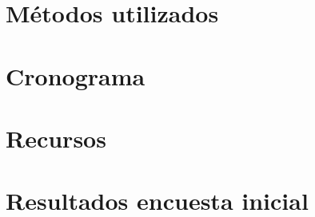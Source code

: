 \documentclass[letter,12pt]{book}
\begin{document}
  \chapter{Métodos utilizados}
  
  
  
  \chapter{Cronograma}
  
  \chapter{Recursos}
  
  
  
  
  
  
  
  \renewcommand\appendixname{Anexo}
  
  \appendix
  \chapter{Resultados encuesta inicial} \label{anexo1}
  
  
  
  
\end{document}
